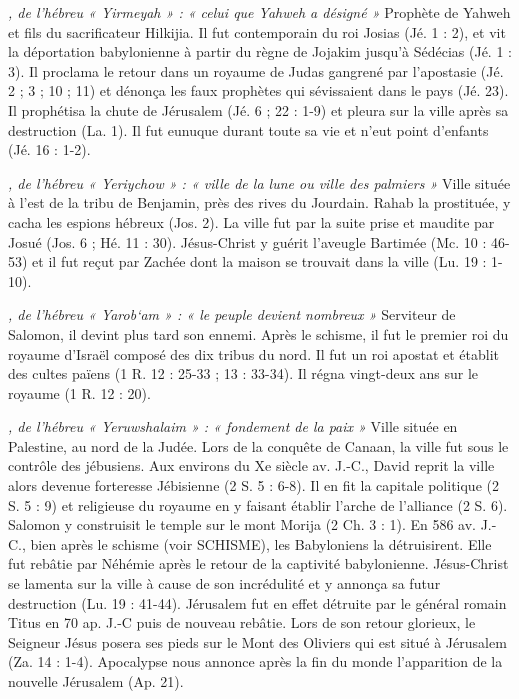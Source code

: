 \begin{multicols}{2}
\textit{, de l'hébreu « Yirmeyah » : « celui que Yahweh a désigné »}\newline
Prophète de Yahweh et fils du sacrificateur Hilkijia. Il fut contemporain du roi Josias (Jé. 1 : 2), et vit la déportation babylonienne à partir du règne de Jojakim jusqu'à Sédécias (Jé. 1 : 3). Il proclama le retour dans un royaume de Judas gangrené par l'apostasie (Jé. 2 ; 3 ; 10 ; 11) et dénonça les faux prophètes qui sévissaient dans le pays (Jé. 23). Il prophétisa la chute de Jérusalem (Jé. 6 ; 22 : 1-9) et pleura sur la ville après sa destruction (La. 1). Il fut eunuque durant toute sa vie et n'eut point d'enfants (Jé. 16 : 1-2).

\textit{, de l'hébreu « Yeriychow » : « ville de la lune ou ville des palmiers »}\newline
Ville située à l'est de la tribu de Benjamin, près des rives du Jourdain.
Rahab la prostituée, y cacha les espions hébreux (Jos. 2). La ville fut par la suite prise et maudite par Josué (Jos. 6 ; Hé. 11 : 30). Jésus-Christ y guérit l'aveugle Bartimée (Mc. 10 : 46-53) et il fut reçut par Zachée dont la maison se trouvait dans la ville (Lu. 19 : 1-10).

\textit{, de l'hébreu « Yarob`am » : « le peuple devient nombreux »}\newline
Serviteur de Salomon, il devint plus tard son ennemi. Après le schisme, il fut le premier roi du royaume d'Israël composé des dix tribus du nord. Il fut un roi apostat et établit des cultes païens (1 R. 12 : 25-33 ; 13 : 33-34). Il régna vingt-deux ans sur le royaume (1 R. 12 : 20).

\textit{, de l'hébreu « Yeruwshalaim » : « fondement de la paix »}\newline
Ville située en Palestine, au nord de la Judée. Lors de la conquête de Canaan, la ville fut sous le contrôle des jébusiens. Aux environs du Xe siècle av. J.-C., David reprit la ville alors devenue forteresse Jébisienne (2 S. 5 : 6-8). Il en fit la capitale politique (2 S. 5 : 9) et religieuse du royaume en y faisant établir l'arche de l'alliance (2 S. 6). Salomon y construisit le temple sur le mont Morija (2 Ch. 3 : 1). En 586 av. J.-C., bien après le schisme (voir SCHISME), les Babyloniens la détruisirent. Elle fut rebâtie par Néhémie après le retour de la captivité babylonienne. Jésus-Christ se lamenta sur la ville à cause de son incrédulité et y annonça sa futur destruction (Lu. 19 : 41-44). Jérusalem fut en effet détruite par le général romain Titus en 70 ap. J.-C puis de nouveau rebâtie. Lors de son retour glorieux, le Seigneur Jésus posera ses pieds sur le Mont des Oliviers qui est situé à Jérusalem (Za. 14 : 1-4). Apocalypse nous annonce après la fin du monde l'apparition de la nouvelle Jérusalem (Ap. 21).


\end{multicols}
